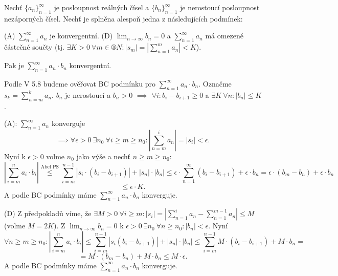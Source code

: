 \documentclass[12pt]{article}                   %
\begin{document}

        \begin{veta}
            Nechť $\{a_n\}_{n = 1}^∞$ je posloupnost reálných čísel a $\{b_n\}_{n = 1}^∞$ je nerostoucí posloupnost nezáporných čísel. Nechť je splněna alespoň jedna z následujících podmínek:
            
            (A) $\sum_{n=1}^∞ a_n$ je konvergentní. (D) $\lim_{n \rightarrow ∞} b_n = 0$ a $\sum_{n=1}^∞ a_n$ má omezené částečné součty (tj. $\exists K > 0\ \forall m \in ®N: |s_m| = |\sum_{n=1}^m a_n| < K$).

            Pak je $\sum_{n=1}^∞ a_n·b_n$ konvergentní.

            \begin{dukazin}
                Podle V 5.8 budeme ověřovat BC podmínku pro $\sum_{n=1}^∞ a_n·b_n$. Označme $s_k = \sum_{n=m}^k a_n$. $b_n$ je nerostoucí a $b_n > 0$ $\implies$ $\forall i: b_i - b_{i+1} ≥ 0$ a $\exists K\ \forall n: |b_n| ≤ K$.

                (A): $\sum_{n=1}^∞ a_n$ konverguje
                $$ \implies \forall \epsilon > 0\ \exists n_0\ \forall i ≥ m ≥ n_0: |\sum_{n=m}^i a_n| = |s_i| < \epsilon. $$
                Nyní k $\epsilon > 0$ volme $n_0$ jako výše a nechť $n ≥ m ≥ n_0$:
                $$ |\sum_{i=m}^n a_i · b_i| \overset{\text{Abel PS}}{≤} \sum_{i=m}^{n-1} |s_i·(b_i - b_{i+1})| + |s_n|·|b_n| ≤ \epsilon · \sum_{n=1}^∞ (b_i - b_{i+1}) + \epsilon·b_n = \epsilon·(b_m - b_n) + \epsilon · b_n $$
                $$ ≤ \epsilon·K. $$
                A podle BC podmínky máme $\sum_{n=1}^∞ a_n·b_n$ konverguje.

                (D) Z předpokladů víme, že $\exists M > 0\ \forall i ≥ m: |s_i| = |\sum_{n=1}^i  a_n - \sum_{n=1}^{m-1} a_n| ≤ M$ (volme $M = 2K$). Z $\lim_{n \rightarrow ∞} b_n = 0$ k $\epsilon > 0\ \exists n_0\ \forall n ≥ n_0: |b_n|<\epsilon$. Nyní 
                $$ \forall n ≥ m ≥ n_0: |\sum_{i=m}^n a_i·b_i| ≤ \sum_{i=m}^{n-1} |s_i(b_i - b_{i+1})| + |s_n|·|b_n| ≤ \sum_{i=m}^{n-1} M·(b_i - b_{i+1}) + M·b_n = $$
                $$ = M·(b_m - b_n) + M·b_n ≤ M·\epsilon. $$
                A podle BC podmínky máme $\sum_{n=1}^∞ a_n·b_n$ konverguje.
            \end{dukazin}
        \end{veta}
\end{document}
